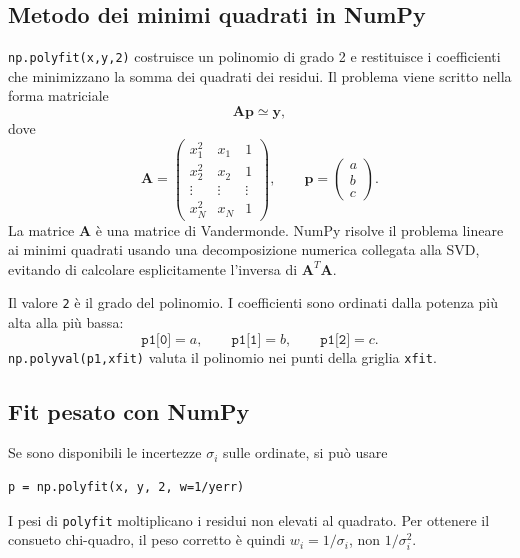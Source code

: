 \documentclass[11pt,a4paper]{book}
\begin{document}
\subsection{Metodo dei minimi quadrati in NumPy}
\texttt{np.polyfit(x,y,2)} costruisce un polinomio di grado 2 e restituisce i coefficienti che minimizzano la somma dei quadrati dei residui. Il problema viene scritto nella forma matriciale
\[
 \mathbf{A}\mathbf{p}\simeq\mathbf{y},
\]
dove
\[
 \mathbf{A}=
 \begin{pmatrix}
 x_1^2 & x_1 & 1\\
 x_2^2 & x_2 & 1\\
 \vdots & \vdots & \vdots\\
 x_N^2 & x_N & 1
 \end{pmatrix},
 \qquad
 \mathbf{p}=
 \begin{pmatrix}a\\b\\c\end{pmatrix}.
\]
La matrice $\mathbf{A}$ è una matrice di Vandermonde. NumPy risolve il problema lineare ai minimi quadrati usando una decomposizione numerica collegata alla SVD, evitando di calcolare esplicitamente l'inversa di $\mathbf{A}^{T}\mathbf{A}$.

Il valore \texttt{2} è il grado del polinomio. I coefficienti sono ordinati dalla potenza più alta alla più bassa:
\[
 \texttt{p1[0]}=a,\qquad
 \texttt{p1[1]}=b,\qquad
 \texttt{p1[2]}=c.
\]
\texttt{np.polyval(p1,xfit)} valuta il polinomio nei punti della griglia \texttt{xfit}.

\subsection{Fit pesato con NumPy}
Se sono disponibili le incertezze $\sigma_i$ sulle ordinate, si può usare
\begin{lstlisting}
p = np.polyfit(x, y, 2, w=1/yerr)
\end{lstlisting}
I pesi di \texttt{polyfit} moltiplicano i residui non elevati al quadrato. Per ottenere il consueto chi-quadro, il peso corretto è quindi $w_i=1/\sigma_i$, non $1/\sigma_i^2$.
\end{document}
